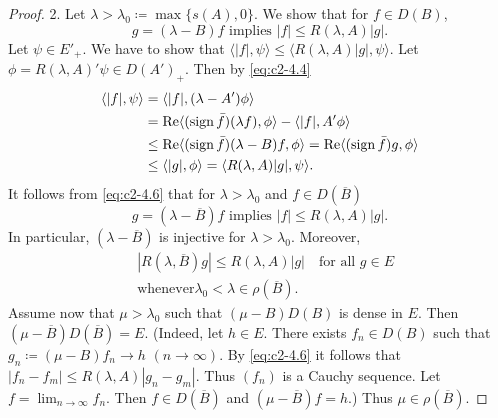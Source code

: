 \begin{proof}
2. Let $\lambda > \lambda_{0} \coloneq \max\{s(A),0\}$. 
We show that for $f \in D(B)$,
\begin{equation}\label{eq:c2-4.6}
g = (\lambda - B)f \text{ implies } |f| \leq R(\lambda,A)|g|.
\end{equation}
Let $\psi \in E'_{+}$. 
We have to show that 
$\langle|f|,\psi\rangle \leq \langle R(\lambda,A)|g|,\psi\rangle$.
Let $\phi = R(\lambda,A)'\psi \in D(A')_{+}$. 
Then by \eqref{eq:c2-4.4}
\begin{align*}
\langle|f|,\psi\rangle &= \langle|f|, (\lambda - A')\phi\rangle \\
&= \mathop{}\!\mathrm{Re}\langle(\operatorname{sign}  \bar{f})(\lambda f),\phi\rangle - \langle|f|,A'\phi\rangle\\
&\leq \mathop{}\!\mathrm{Re}\langle(\operatorname{sign}  \bar{f})(\lambda - B)f,\phi\rangle = \mathop{}\!\mathrm{Re}\langle(\operatorname{sign}  \bar{f})g,\phi\rangle\\
&\leq \langle|g|,\phi\rangle = \langle R(\lambda,A)|g|,\psi\rangle .
\end{align*}
It follows from \eqref{eq:c2-4.6} that for $\lambda > \lambda_{0}$ and $f \in D(\overline{B})$
\begin{equation}\label{eq:c2-4.7}
g = (\lambda - \overline{B})f \text{ implies } |f| \leq R(\lambda,A)|g|.
\end{equation}
In particular, $(\lambda - \overline{B})$ is injective for $\lambda > \lambda_{0}$. 
Moreover,
\begin{equation}\label{eq:c2-4.8}
\begin{split}
&|R(\lambda,\overline{B})g| \leq R(\lambda,A)|g| \quad \text{for all } g \in E\\
&\text{whenever} \lambda_{0} < \lambda \in \rho(\overline{B}).
\end{split}
\end{equation}
Assume now that $\mu > \lambda_{0}$ such that $(\mu - B)D(B)$ is dense in $E$. 
Then 
$(\mu - \overline{B})D(\overline{B}) = E$. 
(Indeed, let $h \in E$. 
There exists $f_{n} \in D(B)$ such that $g_{n} \coloneq (\mu - B)f_{n} \to h$ $(n \to \infty)$. 
By \eqref{eq:c2-4.6} it follows that $|f_{n} - f_{m}| \leq R(\lambda,A)|g_{n} - g_{m}|$. 
Thus $(f_{n})$ is a Cauchy sequence. 
Let $f = \lim_{n \to \infty} f_{n}$. 
Then $f \in D(\overline{B})$ and $(\mu - \overline{B})f = h$.) 
Thus $\mu \in \rho(\overline{B})$.


\end{proof}
